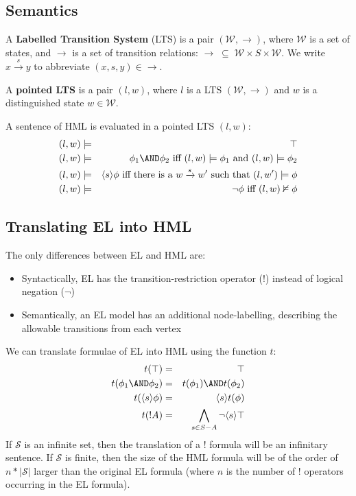 \subsection{Semantics}
A {\bf Labelled Transition System} (LTS) is a pair $(\mathcal{W}, \rightarrow)$, where $\mathcal{W}$ is a set of states, and $\rightarrow$ is a set of transition relations: $\rightarrow \; \subseteq \; \mathcal{W} \times S \times \mathcal{W}$.
We write $x \xrightarrow{s} y$ to abbreviate $(x,s,y) \in \rightarrow$.

A {\bf pointed LTS} is a pair $(l, w)$, where $l$ is a LTS $(\mathcal{W}, \rightarrow)$ and $w$ is a distinguished state $w \in \mathcal{W}$.

A sentence of HML is evaluated in a pointed LTS $(l, w)$:
\begin{eqnarray}
(l,w) & \models & \top \nonumber \\
(l,w) & \models & \phi_1 \AND \phi_2 \mbox{ iff } (l,w)  \models \phi_1 \mbox { and } (l,w) \models \phi_2 \nonumber \\
(l,w) & \models & \langle s \rangle \phi \mbox{ iff there is a } w \xrightarrow{s} w' \mbox { such that } (l,w') \models \phi \nonumber \\
(l,w) & \models & \neg \phi \mbox{ iff } (l,w)  \nvDash \phi \nonumber
\end{eqnarray}

\subsection{Translating EL into HML}
The only differences between EL and HML are:
\begin{itemize}
\item
Syntactically, EL has the transition-restriction operator ($!$) instead of logical negation ($\neg$)
\item
Semantically, an EL model has an additional node-labelling, describing the allowable transitions from each vertex
\end{itemize}
We can translate formulae of EL into HML using the function $t$:
\begin{eqnarray}
t(\top) & = & \top \nonumber \\
t(\phi_1 \AND \phi_2) & = & t(\phi_1) \AND t(\phi_2) \nonumber \\
t(\langle s \rangle \phi) & = & \langle s \rangle t(\phi) \nonumber \\
t(! A) & = & \bigwedge_{s \in S - A} \neg \langle s \rangle \top \nonumber
\end{eqnarray}
If $\mathcal{S}$ is an infinite set, then the translation of a $!$ formula will be an infinitary sentence.
If $\mathcal{S}$ is finite, then the size of the HML formula will be of the order of $n * |\mathcal{S}|$ larger than the original EL formula (where $n$ is the number of $!$ operators occurring in the EL formula).

